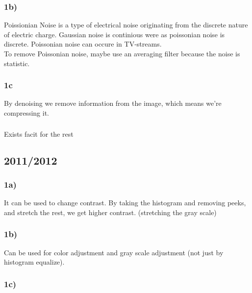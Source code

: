 \documentclass[12pt]{article}
\begin{document}
    \subsubsection*{1b)}
    
        Poissionian Noise is a type of electrical noise originating from the discrete nature of electric charge. 
        Gaussian noise is continious were as poissonian noise is discrete. Poissonian noise can occure in TV-streams. \\
        To remove Poissonian noise, maybe use an averaging filter because the noise is statistic.
        
    \subsubsection*{1c}
    
        By denoising we remove information from the image, which means we're compressing it.
        
    \subsubsection*{}
        
        Exists facit for the rest
        
\subsection{2011/2012}

    \subsubsection*{1a)}
    
        It can be used to change contrast. By taking the histogram and removing peeks, and stretch the rest, we get higher contrast.
        (stretching the gray scale)
    
     \subsubsection*{1b)}
     
        Can be used for color adjustment and gray scale adjustment (not just by histogram equalize).
        
    \subsubsection*{1c)}
    
\end{document}
